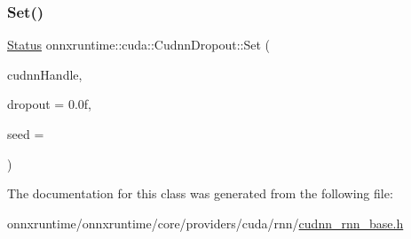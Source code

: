 \subsubsection{\texorpdfstring{Set()}{Set()}}
{\footnotesize\ttfamily \mbox{\hyperlink{classonnxruntime_1_1common_1_1Status}{Status}} onnxruntime\+::cuda\+::\+Cudnn\+Dropout\+::\+Set (\begin{DoxyParamCaption}\item[{const cudnn\+Handle\+\_\+t \&}]{cudnn\+Handle,  }\item[{float}]{dropout = {\ttfamily 0.0f},  }\item[{unsigned long long}]{seed = {} }\end{DoxyParamCaption})\hspace{0.3cm}{\ttfamily [inline]}}



The documentation for this class was generated from the following file\+:\begin{DoxyCompactItemize}
\item 
onnxruntime/onnxruntime/core/providers/cuda/rnn/\mbox{\hyperlink{cudnn__rnn__base_8h}{cudnn\+\_\+rnn\+\_\+base.\+h}}\end{DoxyCompactItemize}
